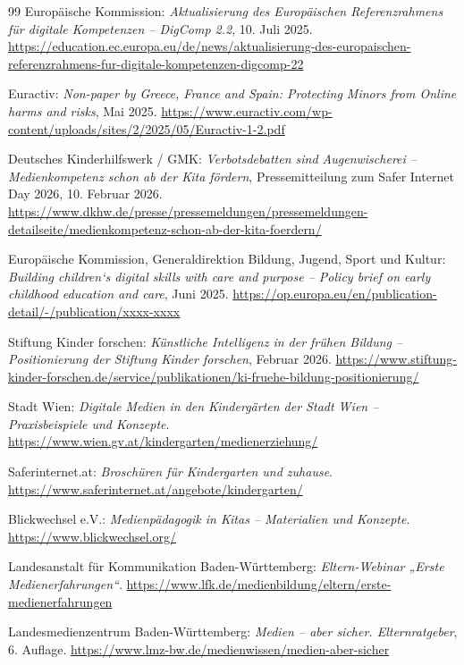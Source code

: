 \documentclass[11pt,a4paper]{article}
\begin{document}
\begin{thebibliography}{99}
		 Europäische Kommission: \textit{Aktualisierung des Europäischen Referenzrahmens für digitale Kompetenzen -- DigComp 2.2}, 10. Juli 2025. \url{https://education.ec.europa.eu/de/news/aktualisierung-des-europaischen-referenzrahmens-fur-digitale-kompetenzen-digcomp-22}
		
		 Euractiv: \textit{Non-paper by Greece, France and Spain: Protecting Minors from Online harms and risks}, Mai 2025. \url{https://www.euractiv.com/wp-content/uploads/sites/2/2025/05/Euractiv-1-2.pdf}
		
		 Deutsches Kinderhilfswerk / GMK: \textit{Verbotsdebatten sind Augenwischerei – Medienkompetenz schon ab der Kita fördern}, Pressemitteilung zum Safer Internet Day 2026, 10. Februar 2026. \url{https://www.dkhw.de/presse/pressemeldungen/pressemeldungen-detailseite/medienkompetenz-schon-ab-der-kita-foerdern/}
		
		 Europäische Kommission, Generaldirektion Bildung, Jugend, Sport und Kultur: \textit{Building children‘s digital skills with care and purpose – Policy brief on early childhood education and care}, Juni 2025. \url{https://op.europa.eu/en/publication-detail/-/publication/xxxx-xxxx}
		
		 Stiftung Kinder forschen: \textit{Künstliche Intelligenz in der frühen Bildung – Positionierung der Stiftung Kinder forschen}, Februar 2026. \url{https://www.stiftung-kinder-forschen.de/service/publikationen/ki-fruehe-bildung-positionierung/}
		
		 Stadt Wien: \textit{Digitale Medien in den Kindergärten der Stadt Wien – Praxisbeispiele und Konzepte}. \url{https://www.wien.gv.at/kindergarten/medienerziehung/}
		
		 Saferinternet.at: \textit{Broschüren für Kindergarten und zuhause}. \url{https://www.saferinternet.at/angebote/kindergarten/}
		
		 Blickwechsel e.V.: \textit{Medienpädagogik in Kitas – Materialien und Konzepte}. \url{https://www.blickwechsel.org/}
		
		 Landesanstalt für Kommunikation Baden-Württemberg: \textit{Eltern-Webinar „Erste Medienerfahrungen“}. \url{https://www.lfk.de/medienbildung/eltern/erste-medienerfahrungen}
		
		 Landesmedienzentrum Baden-Württemberg: \textit{Medien – aber sicher. Elternratgeber}, 6. Auflage. \url{https://www.lmz-bw.de/medienwissen/medien-aber-sicher}
		

\end{thebibliography}
\end{document}

